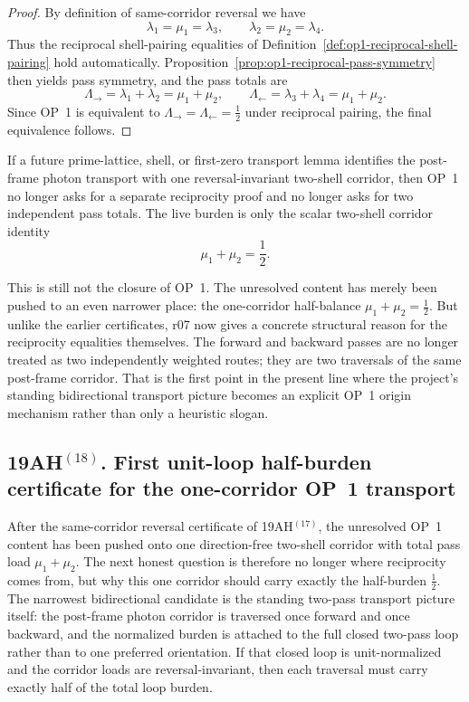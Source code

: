 \begin{proof}
By definition of same-corridor reversal we have
\[
  \lambda_1=\mu_1=\lambda_3,
  \qquad
  \lambda_2=\mu_2=\lambda_4.
\]
Thus the reciprocal shell-pairing equalities of Definition~\ref{def:op1-reciprocal-shell-pairing} hold automatically. Proposition~\ref{prop:op1-reciprocal-pass-symmetry} then yields pass symmetry, and the pass totals are
\[
  \Lambda_{\rightarrow}=\lambda_1+\lambda_2=\mu_1+\mu_2,
  \qquad
  \Lambda_{\leftarrow}=\lambda_3+\lambda_4=\mu_1+\mu_2.
\]
Since OP~1 is equivalent to \(\Lambda_{\rightarrow}=\Lambda_{\leftarrow}=\tfrac12\) under reciprocal pairing, the final equivalence follows.
\end{proof}

\begin{corollary}
\label{cor:op1-live-burden-after-r07}
If a future prime-lattice, shell, or first-zero transport lemma identifies the post-frame photon transport with one reversal-invariant two-shell corridor, then OP~1 no longer asks for a separate reciprocity proof and no longer asks for two independent pass totals. The live burden is only the scalar two-shell corridor identity
\[
  \mu_1+\mu_2=\frac12.
\]
\end{corollary}

\begin{remark}
This is still not the closure of OP~1. The unresolved content has merely been pushed to an even narrower place: the one-corridor half-balance \(\mu_1+\mu_2=\tfrac12\). But unlike the earlier certificates, r07 now gives a concrete structural reason for the reciprocity equalities themselves. The forward and backward passes are no longer treated as two independently weighted routes; they are two traversals of the same post-frame corridor. That is the first point in the present line where the project's standing bidirectional transport picture becomes an explicit OP~1 origin mechanism rather than only a heuristic slogan.
\end{remark}



\subsection*{19AH$^{(18)}$. First unit-loop half-burden certificate for the one-corridor OP~1 transport}
After the same-corridor reversal certificate of 19AH$^{(17)}$, the unresolved OP~1 content has been pushed onto one direction-free two-shell corridor with total pass load \(\mu_1+\mu_2\). The next honest question is therefore no longer where reciprocity comes from, but why this one corridor should carry exactly the half-burden \(\tfrac12\). The narrowest bidirectional candidate is the standing two-pass transport picture itself: the post-frame photon corridor is traversed once forward and once backward, and the normalized burden is attached to the full closed two-pass loop rather than to one preferred orientation. If that closed loop is unit-normalized and the corridor loads are reversal-invariant, then each traversal must carry exactly half of the total loop burden.

